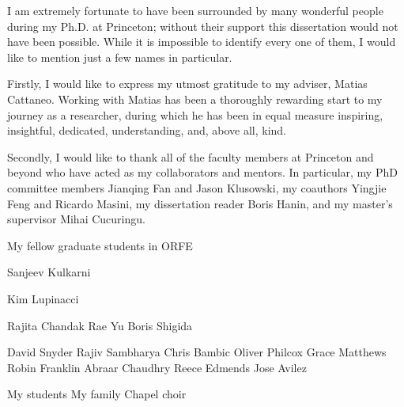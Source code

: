 
I am extremely fortunate to have been surrounded by many wonderful people during
my Ph.D. at Princeton; without their support this dissertation
would not have been possible. While it is impossible to identify every one of
them, I would like to mention just a few names in particular.

Firstly, I would like to express my utmost gratitude to my adviser,
Matias Cattaneo. Working with Matias has been a thoroughly rewarding start to my
journey as a researcher, during which he has been in equal measure inspiring,
insightful, dedicated, understanding, and, above all, kind.

Secondly, I would like to thank all of the faculty members at
Princeton and beyond who have acted as my collaborators and mentors.
In particular, my PhD committee members
Jianqing Fan and Jason Klusowski,
my coauthors Yingjie Feng and Ricardo Masini,
my dissertation reader Boris Hanin,
and my master's supervisor Mihai Cucuringu.

My fellow graduate students in ORFE

Sanjeev Kulkarni

Kim Lupinacci

Rajita Chandak
Rae Yu
Boris Shigida

David Snyder
Rajiv Sambharya
Chris Bambic
Oliver Philcox
Grace Matthews
Robin Franklin
Abraar Chaudhry
Reece Edmends
Jose Avilez

My students
My family
Chapel choir
